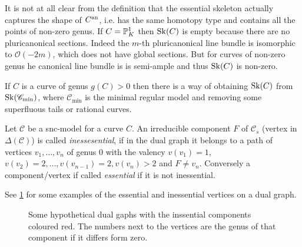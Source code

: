 It is not at all clear from the definition that the essential skeleton actually captures the shape of $C{}^{\text{an}}$, i.e. has the same homotopy type and contains all the points of non-zero genus. 
If $C = \mathbb{P}^{1}_K$ then $\operatorname{Sk}(C)$ is empty because there are no pluricanonical sections. Indeed the $m$-th pluricanonical line bundle is isomorphic to  $\mathcal{O}(-2m)$, which does not have global sections. 
But for curves of non-zero genus he canonical line bundle is is semi-ample and thus $\operatorname{Sk}(C)$ is non-zero. 

If $C$ is a curve of genus $g(C) > 0$ then there is a way of obtaining $\operatorname{Sk}(C)$ from $\operatorname{Sk}(\mathscr C_\text{min} )$, where $\mathscr C _\text{min}$ is the minimal regular model and removing some superfluous tails or rational curves.  

\begin{definition}
	Let $\mathscr C$ be a snc-model for a curve $C$. 
	An irreducible component $F$ of $\mathscr C_s$ (vertex in $\Delta(\mathscr C)$) is called \emph{inessesential}, if in the dual graph it belongs to a path of vertices $v_1, \ldots, v_n$ of genus $0$ with the valency $v(v_1) = 1$, $v(v_{2}) = 2, \ldots, v(v_{n-1}) = 2, v(v_n) > 2$ and $F \ne v_n$. 
	Conversely a component/vertex if called \emph{essential} if it is not inessential. 
\end{definition}
See \cref{fig:inessential_components} for some examples of the essential and inessential vertices on a dual graph. 

\begin{figure}[h]
    \centering
    \caption{Some hypothetical dual gaphs with the inssential components coloured red. 
    The numbers next to the vertices are the genus of that component if it differs form zero.}
    \label{fig:inessential_components}
\end{figure}


